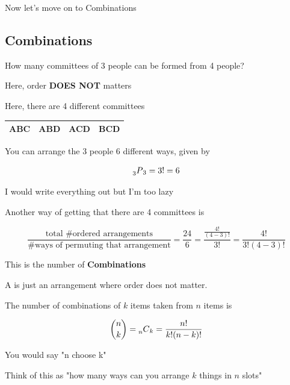 \documentclass[../../Main.tex]{subfiles}
\begin{document}
Now let's move on to Combinations

\subsection{Combinations}

\begin{example}
    How many committees of 3 people can be formed from 4 people?

    Here, order \textbf{DOES NOT} matters

    Here, there are 4 different committees

    \begin{tabular}{|c|c|c|c|}
        \hline
        ABC & ABD & ACD & BCD \\
        \hline
    \end{tabular}

    You can arrange the 3 people 6 different ways, given by 

    $$\prescript{}{3}{P}_3 = 3! = 6$$

    \begin{note}
        I would write everything out but I'm too lazy
    \end{note}

    Another way of getting that there are 4 committees is
    
    
    $$\frac{\text{total \# ordered arrangements}}{\text{\# ways of permuting that arrangement}} = \frac{24}{6} = \frac{\frac{4!}{(4 - 3)!}}{3!} = \frac{4!}{3!(4 - 3)!}$$

    This is the number of \textbf{Combinations}
\end{example}

\begin{definition}[Combination]
    A  is just an arrangement where order does not matter.

    The number of combinations of $k$ items taken from $n$ items is

    $${n \choose k} = \prescript{}{n}{C}_k = \frac{n!}{k!(n - k)!}$$

    You would say "n choose k"

    Think of this as "how many ways can you arrange $k$ things in $n$ slots"
\end{definition}
\end{document}
